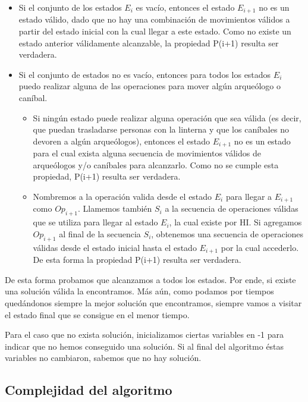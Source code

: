\begin{itemize}
    \item Si el conjunto de los estados $E_i$ es vacío, entonces el estado $E_{i+1}$ no es un estado válido, dado que no hay una combinación de movimientos válidos a partir del estado inicial con la cual llegar a este estado. Como no existe un estado anterior válidamente alcanzable, la propiedad P(i+1) resulta ser verdadera.

    \item Si el conjunto de estados no es vacío, entonces para todos los estados $E_{i}$ puedo realizar alguna de las operaciones para mover algún arqueólogo o caníbal.
    \begin{itemize}
    \item Si ningún estado puede realizar alguna operación que sea válida (es decir, que puedan trasladarse personas con la linterna y que los caníbales no devoren a alg\'un arqueólogos), entonces el estado $E_{i+1}$ no es un estado para el cual exista alguna secuencia de movimientos válidos de arqueólogos y/o caníbales para alcanzarlo. Como no se cumple esta propiedad, P(i+1) resulta ser verdadera.

    \item Nombremos a la operación valida desde el estado $E_{i}$ para llegar a $E_{i+1}$ como $Op_{i+1}$. Llamemos también $S_i$ a la secuencia de operaciones válidas que se utiliza para llegar al estado $E_{i}$, la cual existe por HI. Si agregamos $Op_{i+1}$ al final de la secuencia $S_i$, obtenemos una secuencia de operaciones válidas desde el estado inicial hasta el estado $E_{i+1}$ por la cual accederlo. De esta forma la propiedad P(i+1) resulta ser verdadera.
    \end{itemize}
\end{itemize}


De esta forma probamos que alcanzamos a todos los estados. Por ende, si existe una solución válida la encontramos. Más aún, como podamos por tiempos quedándonos siempre la mejor solución que encontramos, siempre vamos a visitar el estado final que se consigue en el menor tiempo.

Para el caso que no exista solución, inicializamos ciertas variables en -1 para indicar que no hemos conseguido una solución. Si al final del algoritmo éstas variables no cambiaron, sabemos que no hay solución.
\subsection{Complejidad del algoritmo}
